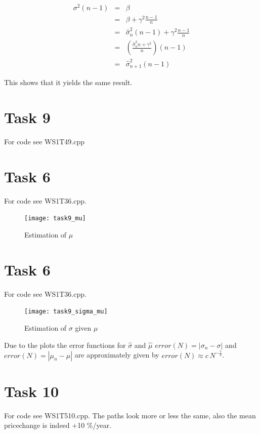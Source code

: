 \documentclass[]{article}
\begin{document}
\begin{eqnarray*}
      \sigma^2 \left(n-1\right) & = & \beta \\
      & = & \beta + \gamma^2\frac{n-1}{n}\\
      & = & \hat{\sigma}^{2}_n\left(n-1\right) + \gamma^2\frac{n-1}{n}\\
      & = & \left(\frac{\hat{\sigma}^{2}_n n+\gamma^2}{n}\right)\left(n-1\right)
      \\
      & = & \hat{\sigma}^{2}_{n+1}\left(n-1\right)
\end{eqnarray*} 

This shows that it yields the same result.

\section*{Task 9}
For code see WS1T49.cpp
\section*{Task 6} For code see WS1T36.cpp.\\

\begin{figure}[!ht]
\texttt{[image: task9\_mu]}
\caption{Estimation of $\mu$}
\label{fig:Task9a}
\end{figure}

\section*{Task 6} For code see WS1T36.cpp.
\begin{figure}[!ht]
\texttt{[image: task9\_sigma\_mu]}
\caption{Estimation of $\sigma$ given $\mu$}
\label{fig:Task9b}
\end{figure}
\clearpage
Due to the plots the error functions for $\hat{\sigma}$ and $\hat{\mu}$
$error(N) = \left|\sigma_n - \sigma\right| $ and $error(N) = \left|\mu_n -
\mu\right| $ are approximately given by $error(N) \approx c\,N^{-\frac{1}{2}}$.


\section*{Task 10} For code see WS1T510.cpp. The paths look more or less the same, also the mean pricechange is indeed +10
\%/year.\\
\end{document}
